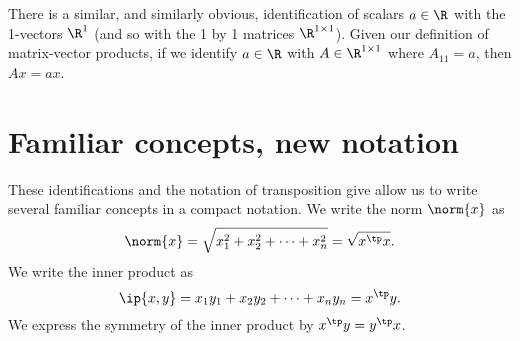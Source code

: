 There is a similar, and similarly obvious, identification of scalars $a \in \R$ with the 1-vectors $\R ^{1}$ (and so with the 1 by 1 matrices $\R ^{1 \times 1}$).
Given our definition of matrix-vector products, if we identify $a \in \R $ with $A \in \R^{1 \times 1}$ where $A_{11} = a$, then $Ax = ax$.

\section*{Familiar concepts, new notation}

These identifications and the notation of transposition give allow us to write several familiar concepts in a compact notation.
We write the norm $\norm{x}$ as
  \[
\norm{x} = \sqrt{x_1^2 + x_2^2 + \cdots + x_n^2} = \sqrt{x^\tp x}.
  \]
We write the inner product as
  \[
\ip{x,y} =
x_1y_1 + x_2y_2 + \cdots + x_ny_n
= x^\tp y.
  \]
We express the symmetry of the inner product by $ x^\tp y = y^\tp x$.
